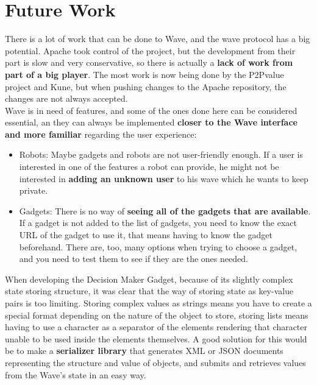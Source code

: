 \newpage
\section{Future Work}

There is a lot of work that can be done to Wave, and the wave protocol has a big potential. Apache took control of the project, but the development from their part is slow and very conservative, so there is actually a \textbf{lack of work from part of a big player}. The most work is now being done by the P2Pvalue project and Kune, but when pushing changes to the Apache repository, the changes are not always accepted.\\[.2cm]
Wave is in need of features, and some of the ones done here can be considered essential, an they can always be implemented \textbf{closer to the Wave interface and more familiar} regarding the user experience:
\begin{itemize}
  \item Robots: Maybe gadgets and robots are not user-friendly enough. If a user is interested in one of the features a robot can provide, he might not be interested in \textbf{adding an unknown user} to his wave which he wants to keep private.
  \item Gadgets: There is no way of \textbf{seeing all of the gadgets that are available}. If a gadget is not added to the list of gadgets, you need to know the exact URL of the gadget to use it, that means having to know the gadget beforehand. There are, too, many options when trying to choose a gadget, and you need to test them to see if they are the ones needed.
\end{itemize}
When developing the Decision Maker Gadget, because of its slightly complex state storing structure, it was clear that the way of storing state as key-value pairs is too limiting. Storing complex values as strings means you have to create a special format depending on the nature of the object to store, storing lists means having to use a character as a separator of the elements rendering that character unable to be used inside the elements themselves. A good solution for this would be to make a \textbf{serializer library} that generates XML or JSON documents representing the structure and value of objects, and submits and retrieves values from the  Wave's state in an easy way.



